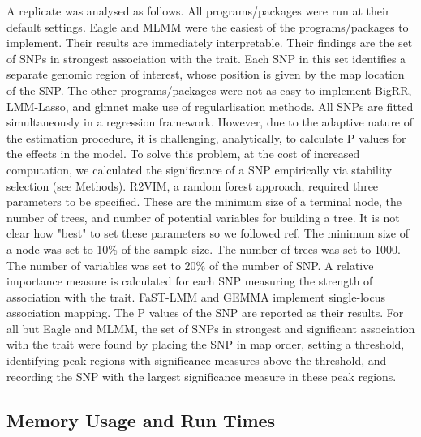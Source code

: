 \documentclass{nature}
\begin{document}
 A replicate was analysed as follows. All programs/packages were run at their default settings. 
 Eagle and MLMM were the easiest of the programs/packages to implement. 
 Their results are immediately 
 interpretable. Their findings are the set of SNPs in strongest association with the trait. Each 
SNP in this set identifies a separate genomic region of interest, whose position is given by the map location of the SNP.  
The other programs/packages were not as easy to implement  BigRR, LMM-Lasso, and glmnet make use of regularlisation methods. 
All SNPs are fitted simultaneously in a regression framework.  However, due to the adaptive nature of the estimation procedure, it is challenging, 
analytically, to calculate P values for the effects in the model. 
To solve this problem, at the cost of increased computation, we calculated the significance of a SNP empirically 
via stability selection (see Methods).  R2VIM, a random forest approach, required three parameters to be specified. These are the
 minimum size of a terminal node, the number of trees, and number of potential variables 
for building a tree.  It is not clear how "best" to set these parameters so we followed ref. The minimum size of a node was set to 10\% of the sample size. 
The number of trees was set to 1000. The number of variables was set to 20\% of the number of SNP. A relative importance measure is calculated 
for each SNP measuring the strength of association with the trait. 
FaST-LMM and GEMMA implement single-locus association mapping. The P values of the SNP are reported as their results. 
For all but Eagle and MLMM, the set of SNPs in strongest and significant association with the trait were found 
by placing the SNP in map order, setting a threshold, identifying peak regions with 
significance measures above the threshold, and recording the SNP with the largest significance measure in these peak regions. 





\subsection{Memory Usage and Run Times}
\end{document}
